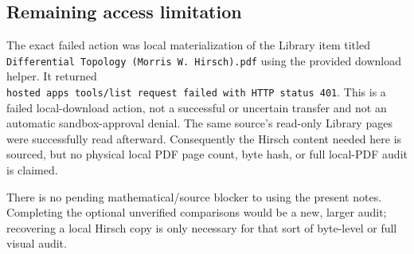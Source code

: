 \documentclass[
  11pt,
]{article}
\begin{document}
\subsection{Remaining access
limitation}\label{remaining-access-limitation}

The exact failed action was local materialization of the Library item
titled \texttt{Differential\ Topology\ (Morris\ W.\ Hirsch).pdf} using
the provided download helper. It returned
\texttt{hosted\ apps\ tools/list\ request\ failed\ with\ HTTP\ status\ 401}.
This is a failed local-download action, not a successful or uncertain
transfer and not an automatic sandbox-approval denial. The same source's
read-only Library pages were successfully read afterward. Consequently
the Hirsch content needed here is sourced, but no physical local PDF
page count, byte hash, or full local-PDF audit is claimed.

There is no pending mathematical/source blocker to using the present
notes. Completing the optional unverified comparisons would be a new,
larger audit; recovering a local Hirsch copy is only necessary for that
sort of byte-level or full visual audit.
\end{document}
